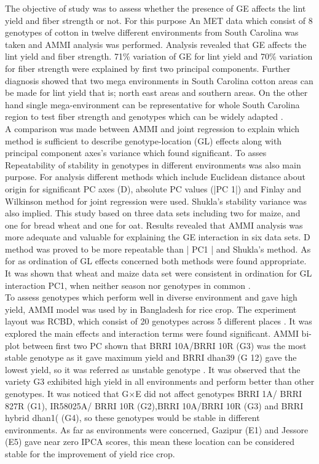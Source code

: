  The objective of study was to assess whether the presence of GE affects the lint yield and fiber strength or not. For this purpose An MET data which consist of 8 genotypes of cotton in twelve different environments from South Carolina was taken and AMMI analysis was performed. Analysis revealed that GE affects the lint yield and fiber strength. 71\% variation of GE for lint yield and 70\% variation for fiber strength were explained by first two principal components. Further diagnosis showed that two mega environments in South Carolina cotton areas can be made for lint yield that is; north east areas and southern areas. On the other hand  single mega-environment can be representative for whole South Carolina region to test fiber strength and genotypes which can be widely adapted \cite{Campbell2005}. \\

A comparison was made between AMMI and joint regression to explain which method is sufficient to describe genotype-location (GL) effects along with principal component axes's variance which found significant. To asses Repeatability of stability in genotypes in different environments was also main purpose. For analysis different methods which include Euclidean distance about origin for significant PC axes (D), absolute PC values (|PC 1|) and Finlay and Wilkinson method for joint regression were used. Shukla's stability variance was also implied. This study based on three data sets including  two for maize,  and one for bread wheat and one for  oat. Results revealed that AMMI analysis was more adequate and valuable for explaining the GE interaction in six data sets. D method was proved to be more repeatable than | PC1 | and Shukla's method. As for as ordination of GL effects concerned both methods were found appropriate. It was shown that wheat and maize data set were consistent in ordination for GL interaction PC1, when neither season nor genotypes in common \cite{Annicchiarico1997}.\\

To assess genotypes which perform well in diverse environment and gave high yield, AMMI model was used by \citep{Akter2014} in Bangladesh for rice crop. The experiment layout was RCBD, which consist of 20 genotypes across 5 different places . It was explored the main effects and interaction terms were found significant. AMMI bi-plot between first two PC shown that BRRI 10A/BRRI 10R (G3) was the most stable genotype as it gave maximum yield and BRRI dhan39 (G 12)  gave the lowest yield, so it was referred as unstable genotype . It was observed that the variety G3 exhibited high yield in all environments and perform better than other genotypes. It was noticed that G$\times$E did not affect genotypes BRRI 1A/ BRRI 827R (G1), IR58025A/ BRRI 10R (G2),BRRI 10A/BRRI 10R (G3) and BRRI hybrid dhan1( (G4), so these genotypes would be stable in different environments. As far as environments were concerned, Gazipur (E1) and Jessore (E5) gave near zero IPCA scores, this mean these location can be considered  stable  for the improvement of yield rice crop. \\
 
